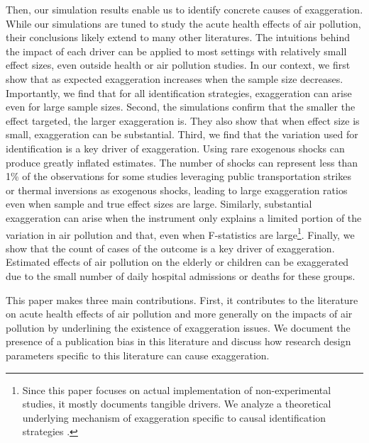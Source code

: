 \documentclass[12pt]{article}
\begin{document}
    Then, our simulation results enable us to identify concrete causes of exaggeration. While our simulations are tuned to study the acute health effects of air pollution, their conclusions likely extend to many other literatures. The intuitions behind the impact of each driver can be applied to most settings with relatively small effect sizes, even outside health or air pollution studies. In our context, we first show that as expected exaggeration increases when the sample size decreases. Importantly, we find that for all identification strategies, exaggeration can arise even for large sample sizes. Second, the simulations confirm that the smaller the effect targeted, the larger exaggeration is. They also show that when effect size is small, exaggeration can be substantial. Third, we find that the variation used for identification is a key driver of exaggeration. Using rare exogenous shocks can produce greatly inflated estimates. The number of shocks can represent less than 1\% of the observations for some studies leveraging public transportation strikes or thermal inversions as exogenous shocks, leading to large exaggeration ratios even when sample and true effect sizes are large. Similarly, substantial exaggeration can arise when the instrument only explains a limited portion of the variation in air pollution and that, even when F-statistics are large\footnote{Since this paper focuses on actual implementation of non-experimental studies, it mostly documents tangible drivers. We analyze a theoretical underlying mechanism of exaggeration specific to causal identification strategies \citep{bagilet_causal_inflation_2022}.}.
    Finally, we show that the count of cases of the outcome is a key driver of exaggeration. Estimated effects of air pollution on the elderly or children can be exaggerated due to the small number of daily hospital admissions or deaths for these groups.


    This paper makes three main contributions. First, it contributes to the literature on acute health effects of air pollution and more generally on the impacts of air pollution by underlining the existence of exaggeration issues. We document the presence of a publication bias in this literature and discuss how research design parameters specific to this literature can cause exaggeration. 
\end{document}
